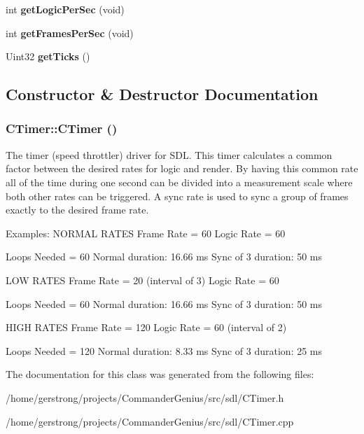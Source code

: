 \begin{DoxyCompactItemize}
\item 
\hypertarget{class_c_timer_a8fbd0175afde779b4d4b7649a77100c2}{
int {\bfseries getLogicPerSec} (void)}
\label{class_c_timer_a8fbd0175afde779b4d4b7649a77100c2}

\item 
\hypertarget{class_c_timer_a466c1bd2b0c2768c84881f6092fadebe}{
int {\bfseries getFramesPerSec} (void)}
\label{class_c_timer_a466c1bd2b0c2768c84881f6092fadebe}

\item 
\hypertarget{class_c_timer_a68fc0aa8157ab8bd7d6bbde7f3bdbb46}{
Uint32 {\bfseries getTicks} ()}
\label{class_c_timer_a68fc0aa8157ab8bd7d6bbde7f3bdbb46}

\end{DoxyCompactItemize}


\subsection{Constructor \& Destructor Documentation}
\hypertarget{class_c_timer_a93e4d770fd09f5e1b984768620cc52bf}{
\subsubsection[{CTimer}]{\setlength{\rightskip}{0pt plus 5cm}CTimer::CTimer ()}}
\label{class_c_timer_a93e4d770fd09f5e1b984768620cc52bf}
The timer (speed throttler) driver for SDL. This timer calculates a common factor between the desired rates for logic and render. By having this common rate all of the time during one second can be divided into a measurement scale where both other rates can be triggered. A sync rate is used to sync a group of frames exactly to the desired frame rate.

Examples: NORMAL RATES Frame Rate = 60 Logic Rate = 60

Loops Needed = 60 Normal duration: 16.66 ms Sync of 3 duration: 50 ms

LOW RATES Frame Rate = 20 (interval of 3) Logic Rate = 60

Loops Needed = 60 Normal duration: 16.66 ms Sync of 3 duration: 50 ms

HIGH RATES Frame Rate = 120 Logic Rate = 60 (interval of 2)

Loops Needed = 120 Normal duration: 8.33 ms Sync of 3 duration: 25 ms 

The documentation for this class was generated from the following files:\begin{DoxyCompactItemize}
\item 
/home/gerstrong/projects/CommanderGenius/src/sdl/CTimer.h\item 
/home/gerstrong/projects/CommanderGenius/src/sdl/CTimer.cpp\end{DoxyCompactItemize}
